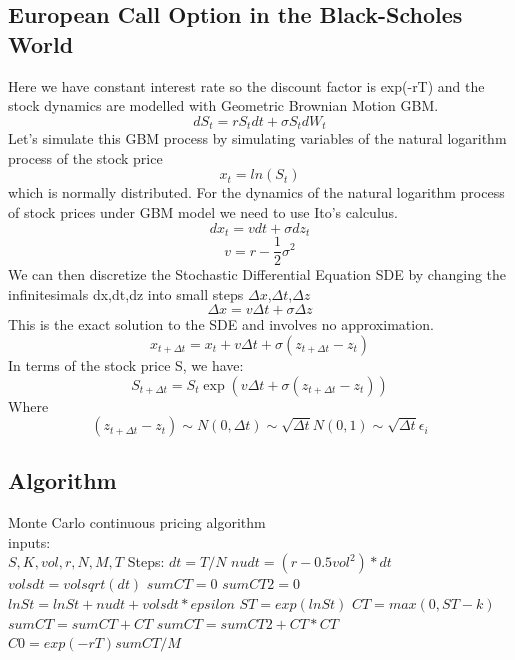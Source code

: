 \subsection{European Call Option in the Black-Scholes World}
\noindent Here we have constant interest rate so the discount factor is exp(-rT) and the stock dynamics are modelled with Geometric Brownian Motion GBM.
$$dS_{t}=rS_{t}dt+\sigma S_{t}dW_{t}$$
Let’s simulate this GBM process by simulating variables of the natural logarithm process of the stock price
$$x_{t}=ln(S_{t})$$ 
which is normally distributed. For the dynamics of the natural logarithm process of stock prices under GBM model we need to use Ito’s calculus.
$$dx_{t}=vdt+\sigma dz_{t}$$
$$v=r-\frac{1}{2}\sigma^2$$
We can then discretize the Stochastic Differential Equation SDE by changing the infinitesimals dx,dt,dz into small steps $\Delta x$,$\Delta t$,$\Delta z$
$$\Delta x=v\Delta t+\sigma\Delta z$$
This is the exact solution to the SDE and involves no approximation.
$$x_{t+\Delta t}=x_{t}+v\Delta t+\sigma(z_{t+\Delta t}-z_{t})$$
In terms of the stock price S, we have:
$$S_{t+\Delta t}=S_{t}\exp({v\Delta t+\sigma(z_{t+\Delta t}-z_{t})})$$
Where
$$(z_{t+\Delta t}-z_{t}) \sim N(0,\Delta t)\sim \sqrt{\Delta t}N(0,1) \sim \sqrt{\Delta t}\epsilon_{i}$$

\subsection{Algorithm} 
\noindent Monte Carlo continuous pricing algorithm\\
inputs:  \\
$S, K, vol, r, N, M, T$ \newline
Steps:
$dt=T/N$ \newline
$nudt=(r-0.5vol^2)*dt$  \newline
$volsdt=volsqrt(dt)$  \newline
$sumCT=0$  \newline
$sumCT2=0$  \newline
\indent $lnSt=lnSt+nudt+volsdt*epsilon$  \newline
\indent $ST=exp(lnSt)$  \newline
\indent $CT=max(0,ST-k)$  \newline
\indent $sumCT=sumCT+CT$  \newline
\indent $sumCT=sumCT2+CT*CT$  \newline
$C0=exp(-rT)sumCT/M$  \newline


